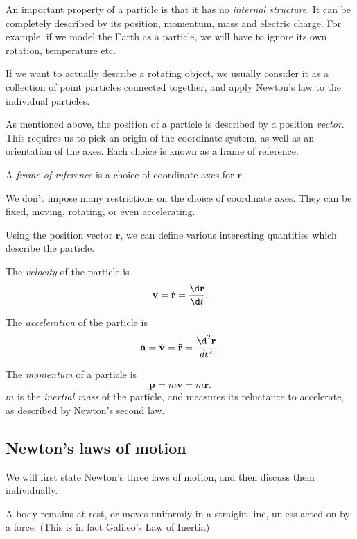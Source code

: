\documentclass[a4paper]{article}
\begin{document}
An important property of a particle is that it has no \emph{internal structure}. It can be completely described by its position, momentum, mass and electric charge. For example, if we model the Earth as a particle, we will have to ignore its own rotation, temperature etc.

If we want to actually describe a rotating object, we usually consider it as a collection of point particles connected together, and apply Newton's law to the individual particles.

As mentioned above, the position of a particle is described by a position \emph{vector}. This requires us to pick an origin of the coordinate system, as well as an orientation of the axes. Each choice is known as a frame of reference.

\begin{defi}
  A \emph{frame of reference} is a choice of coordinate axes for $\mathbf{r}$.
\end{defi}
We don't impose many restrictions on the choice of coordinate axes. They can be fixed, moving, rotating, or even accelerating.

Using the position vector $\mathbf{r}$, we can define various interesting quantities which describe the particle.
\begin{defi}[Velocity]
  The \emph{velocity} of the particle is
  \[
    \mathbf{v} = \dot{\mathbf{r}} = \frac{\d \mathbf{r}}{\d t}.
  \]
\end{defi}

\begin{defi}[Acceleration]
  The \emph{acceleration} of the particle is
  \[
    \mathbf{a} = \dot{\mathbf{v}} = \ddot{\mathbf{r}} = \frac{\d^2 \mathbf{r}}{d t^2}.
  \]
\end{defi}

\begin{defi}[Momentum]
  The \emph{momentum} of a particle is
  \[
    \mathbf{p} = m\mathbf{v} = m\dot{\mathbf{r}}.
  \]
  $m$ is the \emph{inertial mass} of the particle, and measures its reluctance to accelerate, as described by Newton's second law.
\end{defi}

\subsection{Newton's laws of motion}
We will first state Newton's three laws of motion, and then discuss them individually.
\begin{law}
  A body remains at rest, or moves uniformly in a straight line, unless acted on by a force. (This is in fact Galileo's Law of Inertia)
\end{law}
\end{document}
